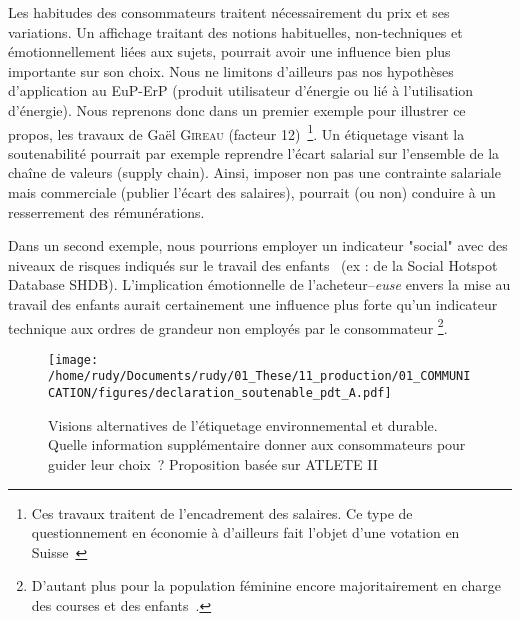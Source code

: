  Les habitudes des consommateurs traitent nécessairement du prix et ses variations.
 Un affichage traitant des notions habituelles, non-techniques et émotionnellement liées aux sujets, pourrait avoir une influence bien plus importante sur son choix.
 Nous ne limitons d'ailleurs pas nos hypothèses d'application au EuP-ErP (produit utilisateur d'énergie ou lié à l'utilisation d'énergie).
 Nous reprenons donc dans un premier exemple pour illustrer ce propos, les travaux de Gaël \textsc{Gireau} (facteur 12)~\footnote{Ces travaux traitent de l'encadrement des salaires. Ce type de questionnement en économie à d'ailleurs fait l'objet d'une votation en Suisse~\cite{chancellerie_federale_suisse_votation_2013,gadrey_ecarts_2013}}.
 Un étiquetage visant la soutenabilité pourrait par exemple reprendre l'écart salarial sur l'ensemble de la chaîne de valeurs (supply chain).
 Ainsi, imposer non pas une contrainte salariale mais commerciale (publier l'écart des salaires), pourrait (ou non) conduire à un resserrement des rémunérations.
 
 Dans un second exemple, nous pourrions employer un indicateur "social" avec des niveaux de risques indiqués sur le travail des enfants~\cite{benoit-norris_identifying_2012,wang_analytic_2016, dreyer_characterisation_2010} (ex : de la Social Hotspot Database SHDB).
 L'implication émotionnelle de l'acheteur--\emph{euse} envers la mise au travail des enfants aurait certainement une influence plus forte qu'un indicateur technique aux ordres de grandeur non employés par le consommateur
 \footnote{D'autant plus pour la population féminine encore majoritairement en charge des courses et des enfants~\cite{ricroch_en_2012}.
 }.
 
 \begin{figure*}[htbp]
   \texttt{[image: /home/rudy/Documents/rudy/01\_These/11\_production/01\_COMMUNICATION/figures/declaration\_soutenable\_pdt\_A.pdf]}
   \caption{Visions alternatives de l’étiquetage environnemental et durable.
   Quelle information supplémentaire donner aux consommateurs pour guider leur choix~?
   Proposition basée sur ATLETE II~\cite{therese_kreitz_atlete_2014}}
   \label{fig:declaration_soutenable_pdt}
 \end{figure*}
   
